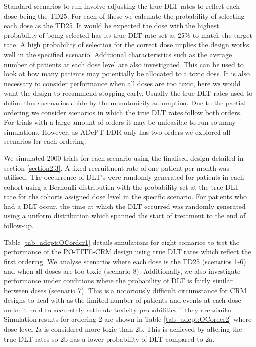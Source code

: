 Standard scenarios to run involve adjusting the true DLT rates to reflect each dose being the TD25. For each of these we calculate the probability of selecting each dose as the TD25. It would be expected the dose with the highest probability of being selected has its true DLT rate set at 25\% to match the target rate. A high probability of selection for the correct dose implies the design works well in the specified scenario. Additional characteristics such as the average number of patients at each dose level are also investigated. This can be used to look at how many patients may potentially be allocated to a toxic dose. It is also necessary to consider performance when all doses are too toxic, here we would want the design to recommend stopping early. Usually the true DLT rates used to define these scenarios abide by the monotonicity assumption. Due to the partial ordering we consider scenarios in which the true DLT rates follow both orders. For trials with a large amount of orders it may be unfeasible to run so many simulations. However, as ADePT-DDR only has two orders we explored all scenarios for each ordering.

We simulated 2000 trials for each scenario using the finalised design detailed in section \ref{section2.3}. A fixed recruitment rate of one patient per month was utilised. The occurrence of DLT's were randomly generated for patients in each cohort using a Bernoulli distribution with the probability set at the true DLT rate for the cohorts assigned dose level in the specific scenario. For patients who had a DLT occur, the time at which the DLT occurred was randomly generated using a uniform distribution which spanned the start of treatment to the end of follow-up.  

Table \ref{tab_adept:OCorder1} details simulations for eight scenarios to test the performance of the PO-TITE-CRM design using true DLT rates which reflect the first ordering. We analyse scenarios where each dose is the TD25 (scenarios 1-6) and when all doses are too toxic (scenario 8). Additionally, we also investigate performance under conditions where the probability of DLT is fairly similar between doses (scenario 7). This is a notoriously difficult circumstance for CRM designs to deal with as the limited number of patients and events at each dose make it hard to accurately estimate toxicity probabilities if they are similar. Simulation results for ordering 2 are shown in Table \ref{tab_adept:OCorder2} where dose level 2a is considered more toxic than 2b. This is achieved by altering the true DLT rates so 2b has a lower probability of DLT compared to 2a. 

